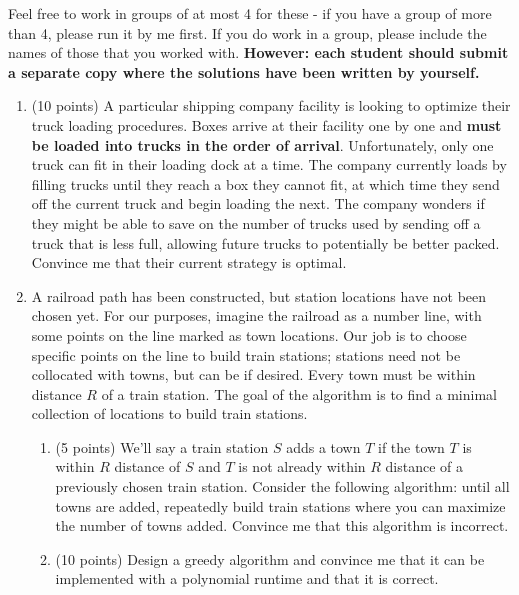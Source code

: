 \documentclass[12pt,letterpaper]{article}
\begin{document}
Feel free to work in groups of at most 4 for these - if you have a group of more than 4, please run it by me first. If you do work in a group, please include the names of those that you worked with. \textbf{However: each student should submit a separate copy where the solutions have been written by yourself.}

\begin{enumerate}
    \item (10 points) A particular shipping company facility is looking to optimize their truck loading procedures. Boxes arrive at their facility one by one and \textbf{must be loaded into trucks in the order of arrival}. Unfortunately, only one truck can fit in their loading dock at a time. The company currently loads by filling trucks until they reach a box they cannot fit, at which time they send off the current truck and begin loading the next. The company wonders if they might be able to save on the number of trucks used by sending off a truck that is less full, allowing future trucks to potentially be better packed. Convince me that their current strategy is optimal. 
    
    \item A railroad path has been constructed, but station locations have not been chosen yet. For our purposes, imagine the railroad as a number line, with some points on the line marked as town locations. Our job is to choose specific points on the line to build train stations; stations need not be collocated with towns, but can be if desired. Every town must be within distance $R$ of a train station. The goal of the algorithm is to find a minimal collection of locations to build train stations.
    \begin{enumerate}
        \item (5 points) We'll say a train station $S$ adds a town $T$ if the town $T$ is within $R$ distance of $S$ and $T$ is not already within $R$ distance of a previously chosen train station. Consider the following algorithm: until all towns are added, repeatedly build train stations where you can maximize the number of towns added. Convince me that this algorithm is incorrect. 
        \item (10 points) Design a greedy algorithm and convince me that it can be implemented with a polynomial runtime and that it is correct. 
    \end{enumerate}
    

\end{enumerate}
\end{document}
